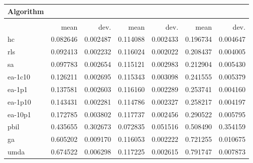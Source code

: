 \begin{tabular}{@{} l *{6}{>{{}}N{1}{2}} @{}}
\toprule
{Algorithm} &  \\
\midrule
&  &  &  \\
\midrule
& {mean} & {dev.} & {mean} & {dev.} & {mean} & {dev.} \\
\midrule
hc & 0.082646 & 0.002487 & 0.114088 & 0.002433 & 0.196734 & 0.004647 \\
rls & 0.092413 & 0.002232 & 0.116024 & 0.002022 & 0.208437 & 0.004005 \\
sa & 0.097783 & 0.002654 & 0.115121 & 0.002983 & 0.212904 & 0.005430 \\
ea-1c10 & 0.126211 & 0.002695 & 0.115343 & 0.003098 & 0.241555 & 0.005379 \\
ea-1p1 & 0.137581 & 0.002603 & 0.116160 & 0.002289 & 0.253741 & 0.004160 \\
ea-1p10 & 0.143431 & 0.002281 & 0.114786 & 0.002327 & 0.258217 & 0.004197 \\
ea-10p1 & 0.172785 & 0.003802 & 0.117737 & 0.002456 & 0.290522 & 0.005795 \\
pbil & 0.435655 & 0.302673 & 0.072835 & 0.051516 & 0.508490 & 0.354159 \\
ga & 0.605202 & 0.009170 & 0.116053 & 0.002222 & 0.721255 & 0.010675 \\
umda & 0.674522 & 0.006298 & 0.117225 & 0.002615 & 0.791747 & 0.007873 \\
\bottomrule
\end{tabular}
